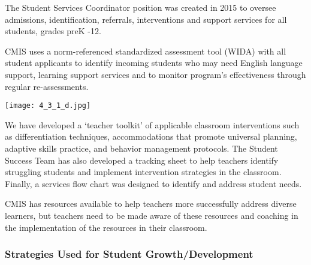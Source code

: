 \begin{findings}
The Student Services Coordinator position was created in 2015 to oversee admissions, identification, referrals, interventions and support services for all students, grades preK -12.

CMIS uses a norm-referenced standardized assessment tool (WIDA) with all student applicants to identify incoming students who may need English language support, learning support services and to monitor program’s effectiveness through regular re-assessments.
 
{\centering\texttt{[image: 4\_3\_1\_d.jpg]}}

We have developed a ‘teacher toolkit’ of applicable classroom interventions such as differentiation techniques, accommodations that promote universal planning, adaptive skills practice, and behavior management protocols. The Student Success Team has also developed a tracking sheet to help teachers identify struggling students and implement intervention strategies in the classroom. Finally, a services flow chart was designed to identify and address student needs.


CMIS has resources available to help teachers more successfully address diverse learners, but teachers need to be made aware of these resources and coaching in the implementation of the resources in their classroom.
\end{findings}

\subsubsection{Strategies Used for Student Growth/Development}



